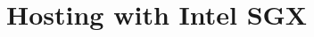 \chapter{Hosting with Intel SGX}
\label{chap:sgx}

\makeatletter
{}
\makeatother
\graphicspath{{sgx/figures/}}



%






\makeatletter
{}
\makeatother
\graphicspath{{}}